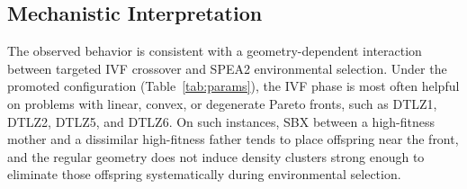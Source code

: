 \documentclass[pdflatex,sn-mathphys-ay]{sn-jnl}%
\theoremstyle{thmstyleone}%
\theoremstyle{thmstyletwo}%
\theoremstyle{thmstylethree}%
\begin{document}
\subsection{Mechanistic Interpretation}\label{subsec:discussion-mechanism}
The observed behavior is consistent with a geometry-dependent interaction between targeted IVF crossover and SPEA2 environmental selection. Under the promoted configuration (Table~\ref{tab:params}), the IVF phase is most often helpful on problems with linear, convex, or degenerate Pareto fronts, such as DTLZ1, DTLZ2, DTLZ5, and DTLZ6. On such instances, SBX between a high-fitness mother and a dissimilar high-fitness father tends to place offspring near the front, and the regular geometry does not induce density clusters strong enough to eliminate those offspring systematically during environmental selection.
\end{document}
